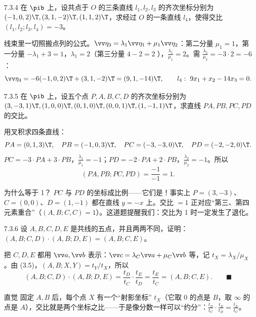 \begin{ex}{7.3.4}
在 $\pib$ 上，设共点于 $O$ 的三条直线 $l_1,l_2,l_3$ 的齐次坐标分别为 $(-1,0,2)\T,(3,1,-2)\T,(1,1,2)\T$，求经过 $O$ 的一条直线 $l_4$，使得交比 $(l_1,l_2;l_3,l_4)=-3$。
\end{ex}
\jie 线束里一切照搬点列的公式。$\vv\eta_3=\lambda_1\vv\eta_1+\mu_1\vv\eta_2$：第二分量 $\mu_1=1$，第一分量 $-\lambda_1+3=1$，$\lambda_1=2$（第三分量 $4-2=2$ \checkmark），$\frac{\lambda_1}{\mu_1}=2$。需 $\frac{\lambda_2}{\mu_2}=-3\cdot2=-6$：
\[
\vv\eta_4=-6(-1,0,2)\T+(3,1,-2)\T=(9,1,-14)\T,\qquad l_4:\ 9x_1+x_2-14x_3=0 .
\]

\begin{ex}{7.3.5}
在 $\pib$ 上，设五个点 $P,A,B,C,D$ 的齐次坐标分别为 $(3,-3,1)\T,(1,0,0)\T,(0,1,0)\T,(0,0,1)\T,(1,-1,1)\T$，求直线 $PA,PB,PC,PD$ 的交比。
\end{ex}
\jie 用叉积求四条直线：
\[
PA=(0,1,3)\T,\quad PB=(-1,0,3)\T,\quad PC=(-3,-3,0)\T,\quad PD=(-2,-2,0)\T .
\]
$PC=-3\cdot PA+3\cdot PB$，$\frac{\lambda_1}{\mu_1}=-1$；$PD=-2\cdot PA+2\cdot PB$，$\frac{\lambda_2}{\mu_2}=-1$。所以
\[
(PA,PB;PC,PD)=\frac{-1}{-1}=1 .
\]
\begin{intbox}{为什么等于 1？}
$PC$ 与 $PD$ 的坐标成比例——它们是！事实上 $P=(3,-3)$、$C=(0,0)$、$D=(1,-1)$ 都在直线 $y=-x$ 上。交比 $=1$ 正对应“第三、第四元素重合”（$(A,B;C,C)=1$）。这道题提醒我们：交比为 1 时一定发生了退化。
\end{intbox}

\begin{ex}{7.3.6}
设 $A,B,C,D,E$ 是共线的五点，并且两两不同，证明：$(A,B;C,D)\cdot(A,B;D,E)=(A,B;C,E)$。
\end{ex}
\zheng 把 $C,D,E$ 都用 $\vv a,\vv b$ 表示：$\vv c=\lambda_C\vv a+\mu_C\vv b$ 等，记 $t_X=\lambda_X/\mu_X$。由 (3.5)，$(A,B;X,Y)=t_Y/t_X$，所以
\[
(A,B;C,D)\cdot(A,B;D,E)=\frac{t_D}{t_C}\cdot\frac{t_E}{t_D}=\frac{t_E}{t_C}=(A,B;C,E).\qquad\blacksquare
\]
\begin{intbox}{直觉}
固定 $A,B$ 后，每个点 $X$ 有一个“射影坐标” $t_X$（它取 $0$ 的点是 $B$，取 $\infty$ 的点是 $A$），交比就是两个坐标之比——于是像分数一样可以“约分”：$\frac{t_D}{t_C}\cdot\frac{t_E}{t_D}=\frac{t_E}{t_C}$。
\end{intbox}

